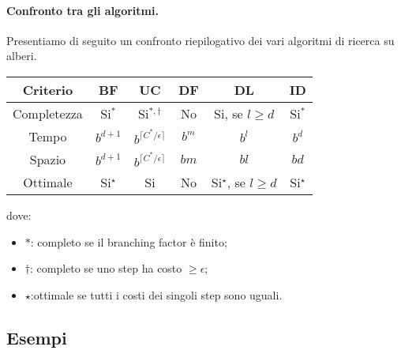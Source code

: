 \documentclass[a4paper, 11pt]{article}
\begin{document}
\paragraph{Confronto tra gli algoritmi.} Presentiamo di seguito un confronto riepilogativo dei vari algoritmi di ricerca su alberi. \\
\begin{center}
	\begin{tabular}{c ccccc}
		\toprule
		\textbf{Criterio} & \textbf{BF} & \textbf{UC} & \textbf{DF} & \textbf{DL} & \textbf{ID} \\
		\midrule
		Completezza & Si$^\ast$ & Si$^{\ast, \dagger}$ & No & Si, se $l \geq d$ & Si$^\ast$ \\
		Tempo & $b^{d+1}$ & $b^{\lceil C^\ast / \epsilon \rceil}$ & $b^m$ & $b^l$ & $b^d$ \\
		Spazio & $b^{d+1}$ & $b^{\lceil C^\ast / \epsilon \rceil}$ & $bm$ & $bl$ & $bd$ \\
		Ottimale & Si$^\star$ & Si & No & Si$^\star$, se $l \geq d$ & Si$^\star$ \\
		\bottomrule
	\end{tabular}
\end{center}
dove: \begin{itemize}
	\item $\ast$: completo se il branching factor è finito;
	\item $\dagger$: completo se uno step ha costo $\geq \epsilon$;
	\item $\star$:ottimale se tutti i costi dei singoli step sono uguali.
\end{itemize}

\subsection{Esempi}
\end{document}
